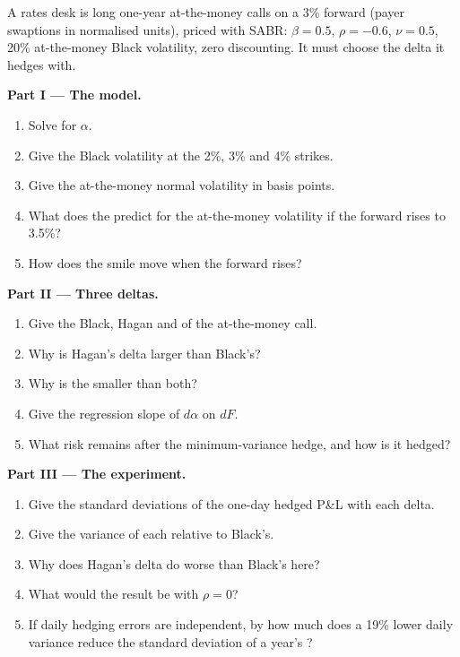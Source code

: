 \begin{problem}\label{pb:dv:sabr-and-smile-dynamics:1}
A rates desk is long one-year at-the-money calls on a 3\% forward (payer swaptions in normalised units), priced with
SABR: $\beta=0.5$, $\rho=-0.6$, $\nu=0.5$, 20\% at-the-money Black volatility, zero discounting. It must choose the
delta it hedges with.

\medskip\noindent\textbf{Part I --- The model.}
\begin{enumerate}
\item Solve for $\alpha$.
\item Give the Black volatility at the 2\%, 3\% and 4\% strikes.
\item Give the at-the-money normal volatility in basis points.
\item What does the  predict for the at-the-money volatility if the forward rises to 3.5\%?
\item How does the smile move when the forward rises?
\end{enumerate}

\medskip\noindent\textbf{Part II --- Three deltas.}
\begin{enumerate}[resume]
\item Give the Black, Hagan and  of the at-the-money call.
\item Why is Hagan's delta larger than Black's?
\item Why is the  smaller than both?
\item Give the regression slope of $d\alpha$ on $dF$.
\item What risk remains after the minimum-variance hedge, and how is it hedged?
\end{enumerate}

\medskip\noindent\textbf{Part III --- The experiment.}
\begin{enumerate}[resume]
\item Give the standard deviations of the one-day hedged P\&L with each delta.
\item Give the variance of each relative to Black's.
\item Why does Hagan's delta do worse than Black's here?
\item What would the result be with $\rho=0$?
\item If daily hedging errors are independent, by how much does a 19\% lower daily variance reduce the
standard deviation of a year's ?
\end{enumerate}


\end{problem}
